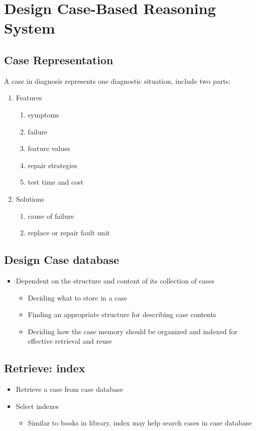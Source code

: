 \section{Design Case-Based Reasoning System}
\subsection{Case Representation}
A case in diagnosis represents one diagnostic situation, include two parts:\\
\begin{enumerate}
\item Features
\begin{enumerate}
\item symptoms
\item failure
\item feature values
\item repair strategies
\item test time and cost
\end{enumerate}
\item Solutions
\begin{enumerate}
\item cause of failure
\item replace or repair fault unit
\end{enumerate}
\end{enumerate}

\subsection{Design Case database}
\begin{itemize}
\item Dependent on the structure and content of its collection of cases
\begin{itemize}
\item Deciding what to store in a case
\item Finding an appropriate structure for describing case contents
\item Deciding how the case memory should be organized and indexed for effective retrieval and reuse
\end{itemize}
\end{itemize}

\subsection{Retrieve: index}
\begin{itemize}
\item Retrieve a case from case database
\item Select indexes
\begin{itemize}
\item Similar to books in library, index may help search cases in case database
\end{itemize}
\end{itemize}

